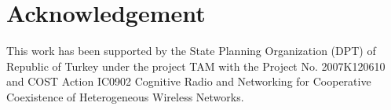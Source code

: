\documentclass[conference,compsoc]{IEEEtran}
\begin{document}
\section*{Acknowledgement}
This work has been supported by the State Planning Organization (DPT) of Republic of Turkey under the project TAM with the Project No. 2007K120610 and COST Action IC0902 Cognitive Radio and Networking for Cooperative Coexistence of Heterogeneous Wireless Networks.




\end{document}
